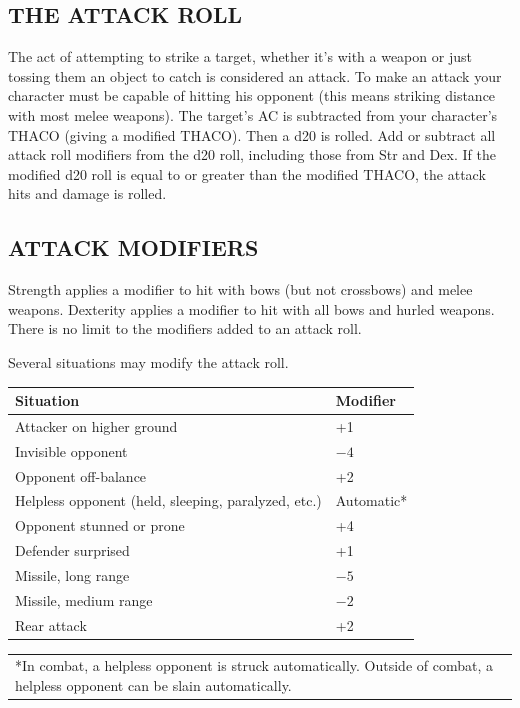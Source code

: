 \begin{multicols}{2}
\subsection{THE ATTACK ROLL}

The act of attempting to strike a target, whether it's with a weapon or just tossing them an object to catch is considered an attack.  To make an attack your character must be capable of hitting his opponent (this means striking distance with most melee weapons).  The target's AC is subtracted from your character's THACO (giving a modified THACO). Then a d20 is rolled. Add or subtract all attack roll modifiers from the d20 roll, including those from Str and Dex.  If the modified d20 roll is equal to or greater than the modified THACO, the attack hits and damage is rolled.

\subsection{ATTACK MODIFIERS}

Strength applies a modifier to hit with bows (but not crossbows) and melee weapons. Dexterity applies a modifier to hit with all bows and hurled weapons.  There is no limit to the modifiers added to an attack roll.  

Several situations may modify the attack roll.

\noindent
\begin{minipage}{\columnwidth}

\label{attackmods}
\noindent
\begin{tabular}{|p{}|p{}|}
\hline
Situation	& Modifier \\
\hline\hline
\rowcolor[gray]{.9}Attacker on higher ground	& +1 \\
Invisible opponent	& $-4$ \\
\rowcolor[gray]{.9}Opponent off-balance	& +2 \\
Helpless opponent (held, sleeping, paralyzed, etc.)	& Automatic* \\
\rowcolor[gray]{.9}Opponent stunned or prone	& +4 \\
Defender surprised	& +1 \\
\rowcolor[gray]{.9}Missile, long range	& $-5$ \\
Missile, medium range	& $-2$ \\
\rowcolor[gray]{.9}Rear attack	& +2 \\
\hline
\end{tabular}
\noindent\begin{tabular}{p{}}
*In combat, a helpless opponent is struck automatically.  Outside of combat, a helpless opponent can be slain automatically. \\
\end{tabular}\vspace{.5em}


\end{minipage}
\end{multicols}
